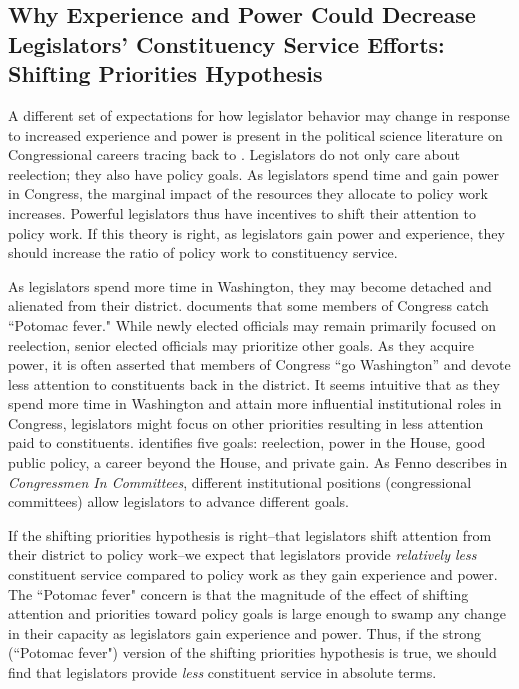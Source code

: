 \documentclass[12pt]{article}
\begin{document}
\subsection{Why Experience and Power Could Decrease Legislators' Constituency Service Efforts: Shifting Priorities Hypothesis}

A different set of expectations for how legislator behavior may change in response to increased experience and power is present in the political science literature on Congressional careers tracing back to \citet{Fenno1973}. Legislators do not only care about reelection; they also have policy goals. As legislators spend time and gain power in Congress, the marginal impact of the resources they allocate to policy work increases. Powerful legislators thus have incentives to shift their attention to policy work. If this theory is right, as legislators gain power and experience, they should increase the ratio of policy work to constituency service.

As legislators spend more time in Washington, they may become detached and alienated from their district. \citet{Fenno1978} documents that some members of Congress catch ``Potomac fever." While newly elected officials may remain primarily focused on reelection, senior elected officials may prioritize other goals. As they acquire power, it is often asserted that members of Congress ``go Washington'' and devote less attention to constituents back in the district. It seems intuitive that as they spend more time in Washington and attain more influential institutional roles in Congress, legislators might focus on other priorities resulting in less attention paid to constituents.  \citet{Fenno1973} identifies five goals: reelection, power in the House, good public policy, a career beyond the House, and private gain. As Fenno describes in \textit{Congressmen In Committees}, different institutional positions (congressional committees) allow legislators to advance different goals. 

If the shifting priorities hypothesis is right--that legislators shift attention from their district to policy work--we expect that legislators provide \textit{relatively less} constituent service compared to policy work as they gain experience and power. The ``Potomac fever" concern is that the magnitude of the effect of shifting attention and priorities toward policy goals is large enough to swamp any change in their capacity as legislators gain experience and power. Thus, if the strong (``Potomac fever") version of the shifting priorities hypothesis is true, we should find that legislators provide \textit{less} constituent service in absolute terms. 
\end{document}
